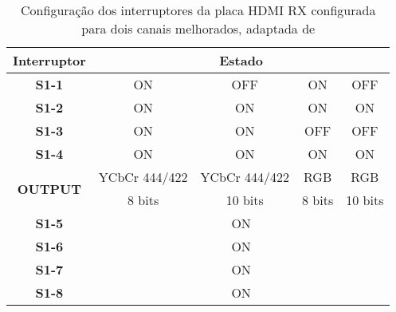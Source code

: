 \begin{table}[h!]
	\centering
	
	\begin{tabular}{|c|c|c|c|c|}
		\hline
		\textbf{Interruptor}             & \multicolumn{4}{c|}{\textbf{Estado}}             \\ \hline
		\textbf{S1-1}                    & ON            & OFF           & ON     & OFF     \\ \hline
		\textbf{S1-2}                    & ON            & ON            & ON     & ON      \\ \hline
		\textbf{S1-3}                    & ON            & ON            & OFF    & OFF     \\ \hline
		\textbf{S1-4}                    & ON            & ON            & ON     & ON      \\ \hline
		\multirow{2}{*}{\textbf{OUTPUT}} & YCbCr 444/422 & YCbCr 444/422 & RGB    & RGB     \\ \cline{2-5} 
		& 8 bits        & 10 bits       & 8 bits & 10 bits \\ \hline
		\textbf{S1-5}                    & \multicolumn{4}{c|}{ON}                          \\ \hline
		\textbf{S1-6}                    & \multicolumn{4}{c|}{ON}                          \\ \hline
		\textbf{S1-7}                    & \multicolumn{4}{c|}{ON}                          \\ \hline
		\textbf{S1-8}                    & \multicolumn{4}{c|}{ON}                          \\ \hline
	\end{tabular}
	\caption{Configuração dos interruptores da placa HDMI RX configurada para dois canais melhorados, adaptada de \cite{R013}}
	\label{table:HDMI_2ch_melhoradp_RX}
\end{table}

